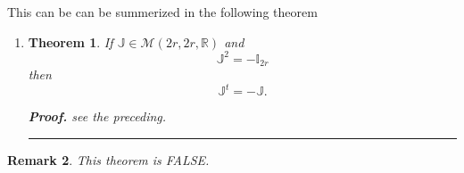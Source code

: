 \documentclass[aps,preprint]{revtex4}
\newtheorem{theorem}{Theorem}
\newtheorem{remark}[theorem]{Remark}
\newenvironment{proof}[1][Proof]{\noindent\textbf{#1.} }{\ \rule{0.5em}{0.5em}}
\begin{document}
This can be can be summerized in the following theorem

\begin{enumerate}
\item 
\begin{theorem}
If $\mathbb{J}\in \mathcal{M}\left( 2r,2r,\mathbb{R}\right) $ and 
\begin{equation}
\mathbb{J}^{2}=-\mathbb{I}_{2r}
\end{equation}%
then 
\begin{equation}
\mathbb{J}^{t}=-\mathbb{J}.
\end{equation}

\begin{proof}
see the preceding.
\end{proof}
\end{theorem}
\end{enumerate}

\begin{remark}
{\LARGE This theorem is FALSE. }
\end{remark}
\end{document}
